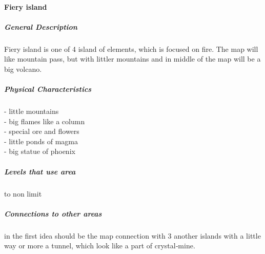 \documentclass[parskip=full]{scrartcl}
\begin{document}
					\paragraph{Fiery island}\vspace{-0.5cm}
						\subparagraph{General Description} \vspace{-0.5cm}
							\par \begingroup
							\leftskip=2cm
							\noindent
									Fiery island is one of 4 island of elements, which is focused on fire. The map will like mountain pass, but with littler mountains and in middle of the map will be a big volcano.
							\par \endgroup
						\subparagraph{Physical Characteristics} \vspace{-0.5cm}
							\par \begingroup
							\leftskip=2cm
							\noindent
									- little mountains \\
									- big flames like a column \\
									- special ore and flowers \\
									- little ponds of magma \\
									- big statue of phoenix
							\par \endgroup
						\subparagraph{Levels that use area} \vspace{-0.5cm}
							\par \begingroup
							\leftskip=2cm
							 to non limit
							\par \endgroup
						\subparagraph{Connections to other areas} \vspace{-0.5cm}
							\par \begingroup
							\leftskip=2cm
							\noindent
									in the first idea should be the map connection with 3 another islands with a little way or more a tunnel, which look like a part of crystal‑mine.
							\par \endgroup
\end{document}
